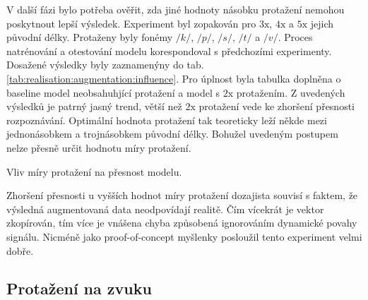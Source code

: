 V další fázi bylo potřeba ověřit, zda jiné hodnoty násobku protažení nemohou poskytnout lepší výsledek.
Experiment byl zopakován pro $3\mathrm{x}$, $4\mathrm{x}$ a $5\mathrm{x}$ jejich původní délky.
Protaženy byly fonémy $/k/$, $/p/$, $/s/$, $/t/$ a $/v/$.
Proces natrénování a otestování modelu korespondoval s předchozími experimenty.
Dosažené výsledky byly zaznamenýny do tab. \ref{tab:realisation:augmentation:influence}.
Pro úplnost byla tabulka doplněna o baseline model neobsahuhjící protažení a model s $2\mathrm{x}$ protažením.
Z uvedených výsledků je patrný jasný trend, větší než $2\mathrm{x}$ protažení vede ke zhoršení přesnosti rozpoznávání.
Optimální hodnota protažení tak teoreticky leží někde mezi jednonásobkem a trojnásobkem původní délky.
Bohužel uvedeným postupem nelze přesně určit hodnotu míry protažení.

\begin{table}[htpb]
  \centering
  \def\arraystretch{1.5}
  \caption{Vliv míry protažení na přesnost modelu.}
  \label{tab:realisation:augmentation:influence}
\end{table}

Zhoršení přesnosti u vyšších hodnot míry protažení dozajista souvisí s faktem, že výsledná augmentovaná data neodpovídají realitě. Čím vícekrát je vektor zkopírován, tím více je vnášena chyba způsobená ignorováním dynamické povahy signálu. Nicméně jako proof-of-concept myšlenky posloužil tento experiment velmi dobře.

\subsection{Protažení na zvuku}
\label{chap:realisation:augmentation:audio}


